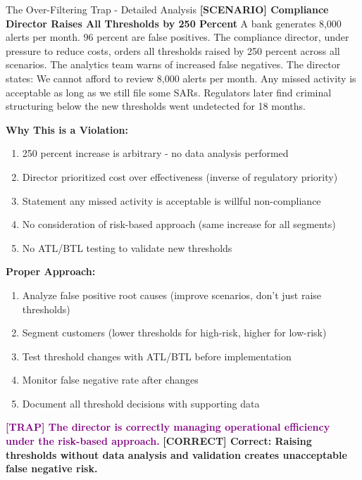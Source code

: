 \documentclass[11pt,a4paper]{beamer}
\newcommand{\trap}[1]{\textcolor{purple}{\textbf{[TRAP] #1}}}
\newcommand{\correct}[1]{\textcolor{green!50!black}{\textbf{[CORRECT] #1}}}
\newcommand{\scenario}[1]{\textcolor{blue!70!black}{\textbf{[SCENARIO] #1}}}
\begin{document}
	\begin{frame}{The Over-Filtering Trap - Detailed Analysis}
		\scenario{Compliance Director Raises All Thresholds by 250 Percent}
		A bank generates 8,000 alerts per month. 96 percent are false positives. The compliance director, under pressure to reduce costs, orders all thresholds raised by 250 percent across all scenarios. The analytics team warns of increased false negatives. The director states: We cannot afford to review 8,000 alerts per month. Any missed activity is acceptable as long as we still file some SARs. Regulators later find criminal structuring below the new thresholds went undetected for 18 months.
		
		\textbf{Why This is a Violation:}
		\begin{enumerate}
			\item 250 percent increase is arbitrary - no data analysis performed
			\item Director prioritized cost over effectiveness (inverse of regulatory priority)
			\item Statement any missed activity is acceptable is willful non-compliance
			\item No consideration of risk-based approach (same increase for all segments)
			\item No ATL/BTL testing to validate new thresholds
		\end{enumerate}
		
		\textbf{Proper Approach:}
		\begin{enumerate}
			\item Analyze false positive root causes (improve scenarios, don't just raise thresholds)
			\item Segment customers (lower thresholds for high-risk, higher for low-risk)
			\item Test threshold changes with ATL/BTL before implementation
			\item Monitor false negative rate after changes
			\item Document all threshold decisions with supporting data
		\end{enumerate}
		
		\trap{The director is correctly managing operational efficiency under the risk-based approach.}
		\correct{Correct: Raising thresholds without data analysis and validation creates unacceptable false negative risk.}
	\end{frame}
	
\end{document}
